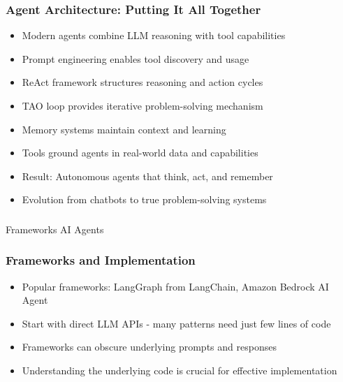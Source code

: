 \begin{frame}[fragile]\frametitle{Agent Architecture: Putting It All Together}
      \begin{itemize}
	  \item Modern agents combine LLM reasoning with tool capabilities
	  \item Prompt engineering enables tool discovery and usage
	  \item ReAct framework structures reasoning and action cycles
	  \item TAO loop provides iterative problem-solving mechanism
	  \item Memory systems maintain context and learning
	  \item Tools ground agents in real-world data and capabilities
	  \item Result: Autonomous agents that think, act, and remember
	  \item Evolution from chatbots to true problem-solving systems
	  \end{itemize}
\end{frame}


\begin{frame}[fragile]\frametitle{}
\begin{center}
{\Large Frameworks AI Agents}

\end{center}
\end{frame}


\begin{frame}[fragile]\frametitle{Frameworks and Implementation}
    \begin{itemize}
        \item Popular frameworks: LangGraph from LangChain, Amazon Bedrock AI Agent
        \item Start with direct LLM APIs - many patterns need just few lines of code
        \item Frameworks can obscure underlying prompts and responses
        \item Understanding the underlying code is crucial for effective implementation
    \end{itemize}
\end{frame}


